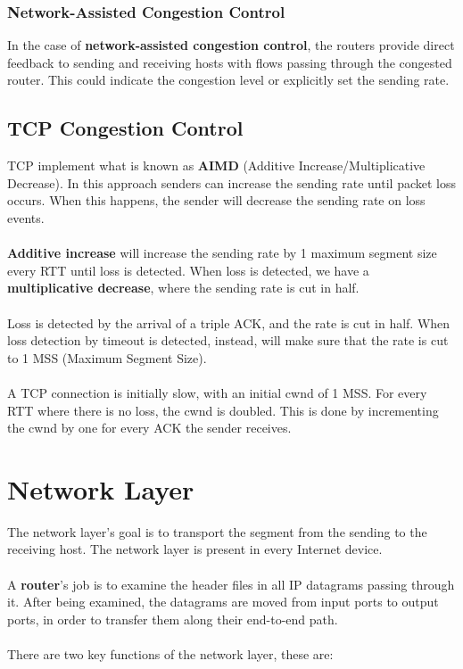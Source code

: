 \documentclass{article}
\begin{document}
\subsubsection{Network-Assisted Congestion Control}
In the case of \textbf{network-assisted congestion control}, the routers provide direct feedback to sending and receiving hosts with flows passing through the congested router. This could indicate the congestion level or explicitly set the sending rate.

\subsection{TCP Congestion Control}
TCP implement what is known as \textbf{AIMD} (Additive Increase/Multiplicative Decrease). In this approach senders can increase the sending rate until packet loss occurs. When this happens, the sender will decrease the sending rate on loss events. \\ \\
\textbf{Additive increase} will increase the sending rate by 1 maximum segment size every RTT until loss is detected. When loss is detected, we have a \textbf{multiplicative decrease}, where the sending rate is cut in half. \\ \\
Loss is detected by the arrival of a triple ACK, and the rate is cut in half. When loss detection by timeout is detected, instead, will make sure that the rate is cut to 1 MSS (Maximum Segment Size). \\ \\
A TCP connection is initially slow, with an initial cwnd of 1 MSS. For every RTT where there is no loss, the cwnd is doubled. This is done by incrementing the cwnd by one for every ACK the sender receives.

\section{Network Layer}
The network layer's goal is to transport the segment from the sending to the receiving host. The network layer is present in every Internet device. \\ \\
A \textbf{router}'s job is to examine the header files in all IP datagrams passing through it. After being examined, the datagrams are moved from input ports to output ports, in order to transfer them along their end-to-end path. \\ \\
There are two key functions of the network layer, these are:
\end{document}
